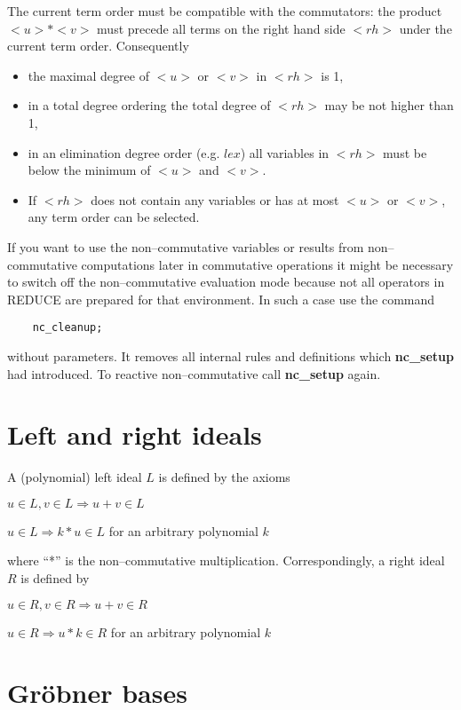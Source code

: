 The current term order must be compatible with the commutators:
the product $<u>*<v>$ must precede all terms on the right hand
side $<rh>$ under the current term order. Consequently
\begin{itemize}
\item the maximal degree of $<u>$ or $<v>$ in $<rh>$ is 1,
\item in a total degree ordering the total degree of $<rh>$ may be
not higher than 1,
\item in an elimination degree order (e.g. $lex$) all variables in
$<rh>$ must be below the minimum of $<u>$ and $<v>$.
\item If $<rh>$ does not contain any variables or has at most $<u>$ or
$<v>$, any term order can be selected.
\end{itemize}

If you want to use the non--commutative variables or results from
non--commutative computations later in commutative operations
it might be necessary to switch off the non--commutative
evaluation mode because not
all operators in REDUCE are prepared for that environment. In
such a case use the command
\begin{verbatim}
    nc_cleanup;
\end{verbatim}
without parameters. It removes all internal rules and definitions
which {\bf nc\_setup} had introduced. To reactive non--commutative
call {\bf nc\_setup} again.

\section{Left and right ideals}

A (polynomial) left ideal $L$ is defined by the axioms

$u \in L, v \in L \Longrightarrow u+v \in L$

$u \in L \Longrightarrow k*u \in L$ for an arbitrary polynomial $k$

where ``*'' is the non--commutative multiplication. Correspondingly,
a right ideal $R$ is defined by

$u \in R, v \in R \Longrightarrow u+v \in R$

$u \in R \Longrightarrow u*k \in R$ for an arbitrary polynomial $k$

\section{Gr\"obner bases}

